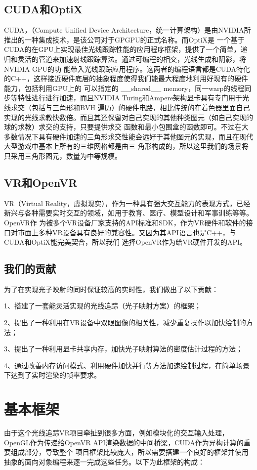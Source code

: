 \documentclass[UTF8]{ctexart}
\begin{document}
    \subsection{CUDA和OptiX}
        CUDA，（Compute Unified Device Architecture，统一计算架构）是由NVIDIA所推出的一种集成技术，是该公司对于GPGPU的正式名称。而OptiX\cite{2010OptiX}是
        一个基于CUDA的在GPU上实现最佳光线跟踪性能的应用程序框架，提供了一个简单，递归和灵活的管道来加速射线跟踪算法。通过可编程的相交，光线生成和阴影，将NVIDIA GPU的功
        能带入光线跟踪应用程序。这两者的编程语言都是CUDA特化的C++，这样接近硬件底层的抽象程度使得我们能最大程度地利用好现有的硬件能力，包括利用GPU上的
        可以指定的 \_\_shared\_\_ memory，同一warp的线程同步等特性进行进行加速，而且NVIDIA Turing和Ampere架构显卡具有专门用于光线求交（包括与三角形和BVH
        遍历）的硬件电路，相比传统的在着色器里面自己实现的光线求教快数倍。而且其还保留对自己实现的其他种类图元（如自己实现的球的求教）求交的支持，只要提供求交
        函数和最小包围盒的函数即可。不过在大多数情况下具有硬件加速的三角形求交性能会远好于其他图元的实现，而且在现代大型游戏中基本上所有的三维网格都是由三
        角形构成的，所以这里我们的场景将只采用三角形图元，数量为中等规模。
    \subsection{VR和OpenVR}
        VR（Virtual Reality，虚拟现实），作为一种具有强大交互能力的表现方式，已经新兴与各种需要实时交互的领域，如用于教育、医疗、模型设计和军事训练等等。OpenVR作
        为被多个VR设备厂家支持的API标准和SDK，作为VR硬件和软件的接口对市面上多种VR设备具有良好的兼容性。又因为其API语言也是C++，与CUDA和OptiX能完美契合，所以我们
        选择OpenVR作为给VR硬件开发的API。
    \subsection{我们的贡献}
        为了在实现光子映射的同时保证较高的实时性，我们做出了以下贡献：

        1、搭建了一套能灵活实现的光线追踪（光子映射方案）的框架；

        2、提出了一种利用在VR设备中双眼图像的相关性，减少重复操作以加快绘制的方法；

        3、提出了一种利用显卡共享内存，加快光子映射算法的密度估计过程的方法；

        4、通过改善内存访问模式、利用硬件加快并行等方法加速绘制过程，在简单场景下达到了实时渲染的帧率要求。
\section{基本框架}
    由于这个光线追踪VR项目牵扯到很多方面，例如模块化的交互输入处理，OpenGL作为传递给OpenVR API渲染数据的中间桥梁，CUDA作为异构计算的重要组成部分，导致整个
    项目框架比较庞大，所以需要搭建一个良好的框架并使用抽象的面向对象编程来逐一完成这些任务。以下为此框架的构成：\\
    
\end{document}
